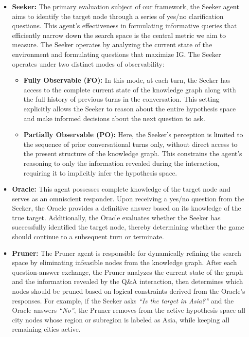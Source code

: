 \documentclass[letterpaper]{article} %
\begin{document}
\begin{itemize}
    \item \textbf{Seeker:} The primary evaluation subject of our framework, the Seeker agent aims to identify the target node through a series of yes/no clarification questions. This agent's effectiveness in formulating informative queries that efficiently narrow down the search space is the central metric we aim to measure. The Seeker operates by analyzing the current state of the environment and formulating questions that maximize IG. 
    The Seeker operates under two distinct modes of observability:
    \begin{itemize}
        \item \textbf{Fully Observable (FO):} In this mode, at each turn, the Seeker has access to the complete current state of the knowledge graph along with the full history of previous turns in the conversation. This setting explicitly allows the Seeker to reason about the entire hypothesis space and make informed decisions about the next question to ask.
        \item \textbf{Partially Observable (PO):} Here, the Seeker’s perception is limited to the sequence of prior conversational turns only, without direct access to the present structure of the knowledge graph. This constrains the agent’s reasoning to only the information revealed during the interaction, requiring it to implicitly infer the hypothesis space.
    \end{itemize}

    \item \textbf{Oracle:} This agent possesses complete knowledge of the target node and serves as an omniscient responder. Upon receiving a yes/no question from the Seeker, the Oracle provides a definitive answer based on its knowledge of the true target. Additionally, the Oracle evaluates whether the Seeker has successfully identified the target node, thereby determining whether the game should continue to a subsequent turn or terminate.
    
    \item \textbf{Pruner:} The Pruner agent is responsible for dynamically refining the search space by eliminating infeasible nodes from the knowledge graph. After each question-answer exchange, the Pruner analyzes the current state of the graph and the information revealed by the Q\&A interaction, then determines which nodes should be pruned based on logical constraints derived from the Oracle's responses. For example, if the Seeker asks \emph{``Is the target in Asia?''} and the Oracle answers \emph{``No''}, the Pruner removes from the active hypothesis space all city nodes whose region or subregion is labeled as Asia, while keeping all remaining cities active.
\end{itemize}
\end{document}
